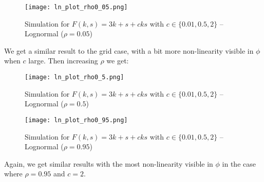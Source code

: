 \documentclass{article}
\begin{document}
	\begin{figure}[H]
	\centering
	\texttt{[image: ln\_plot\_rho0\_05.png]}
	\caption{Simulation for $F(k,s) = 3k + s + cks$ with $c\in\{0.01,0.5,2\}$ -- Lognormal ($\rho=0.05$)}
\end{figure}

We get a similar result to the grid case, with a bit more non-linearity visible in $\phi$ when $c$ large. Then increasing $\rho$ we get:

	\begin{figure}[H]
	\centering
	\texttt{[image: ln\_plot\_rho0\_5.png]}
	\caption{Simulation for $F(k,s) = 3k + s + cks$ with $c\in\{0.01,0.5,2\}$ -- Lognormal ($\rho=0.5$)}
\end{figure}

	\begin{figure}[H]
	\centering
	\texttt{[image: ln\_plot\_rho0\_95.png]}
	\caption{Simulation for $F(k,s) = 3k + s + cks$ with $c\in\{0.01,0.5,2\}$ -- Lognormal ($\rho=0.95$)}
\end{figure}

Again, we get similar results with the most non-linearity visible in $\phi$ in the case where $\rho = 0.95$ and $c=2$. 
\end{document}
